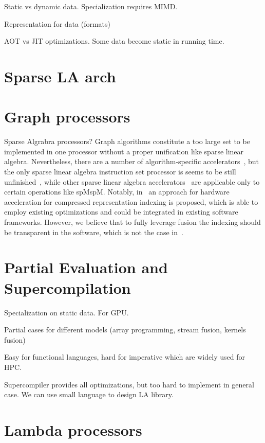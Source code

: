 \documentclass[10pt,conference]{IEEEtran}
\newcommand\todo[1]{{\color{red}#1}}
\begin{document}

\todo{Static vs dynamic data.}
\todo{Specialization requires MIMD.}

\todo{Representation for data (formats)}

\todo{AOT vs JIT optimizations.} 
\todo{Some data become static in running time.} 


\section{Sparse LA arch}

\section{Graph processors}
\todo{Sparse Algrabra processors?}
Graph algorithms constitute a too large set to be implemented in one processor without a proper unification like sparse linear algebra. 
Nevertheless, there are a number of algorithm-specific accelerators~\cite{besta2019graph}, but the only sparse linear algebra instruction set processor is seems to be still unfinished~\cite{Song_2016},
while other sparse linear algebra accelerators~\cite{Song_2016,CPU-FPGA,OuterSpace,zhang2020sparch} are applicable only to certain operations like spMspM.
Notably, in~\cite{smash} an approach for hardware acceleration for compressed representation indexing is proposed, which is able to employ existing optimizations and could be integrated in existing software frameworks.  
However, we believe that to fully leverage fusion the indexing should be transparent in the software, which is not the case in~\cite{smash}.

\section{Partial Evaluation and Supercompilation}

Specialization on static data.
For GPU.

Partial cases for different models (array programming, stream fusion, kernels fusion)

Easy for functional languages, hard for imperative which are widely used for HPC.

Supercompiler provides all optimizations, but too hard to implement in general case. 
We can use small language to design LA library.

\section{Lambda processors}
\end{document}
